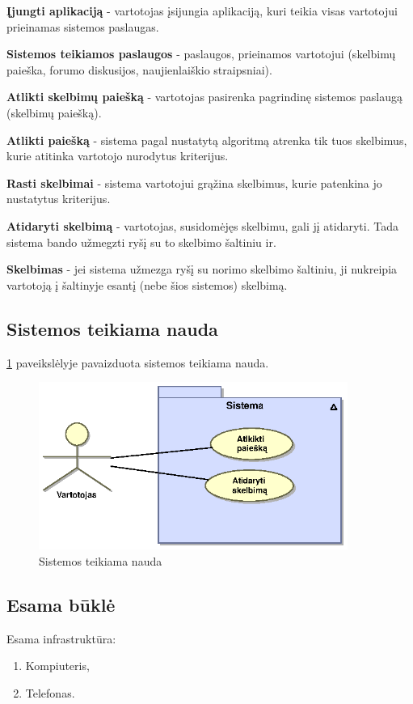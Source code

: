 \documentclass[12pt]{article}
\begin{document}
	\textbf{Įjungti aplikaciją} - vartotojas įsijungia aplikaciją, kuri teikia visas vartotojui prieinamas sistemos paslaugas.
	
	\textbf{Sistemos teikiamos paslaugos} - paslaugos, prieinamos vartotojui (skelbimų paieška, forumo diskusijos, naujienlaiškio straipsniai).
	
	\textbf{Atlikti skelbimų paiešką} - vartotojas pasirenka pagrindinę sistemos paslaugą (skelbimų paiešką).
	
	\textbf{Atlikti paiešką} - sistema pagal nustatytą algoritmą atrenka tik tuos skelbimus, kurie atitinka vartotojo nurodytus kriterijus.
	
	\textbf{Rasti skelbimai} - sistema vartotojui grąžina skelbimus, kurie patenkina jo nustatytus kriterijus.
	
	\textbf{Atidaryti skelbimą} - vartotojas, susidomėjęs skelbimu, gali jį  atidaryti. Tada sistema bando užmegzti ryšį su to skelbimo šaltiniu ir.
	
	\textbf{Skelbimas} - jei sistema užmezga ryšį su norimo skelbimo šaltiniu, ji nukreipia vartotoją į šaltinyje esantį (nebe šios sistemos) skelbimą.
	
	\subsection{Sistemos teikiama nauda}
	\ref{Gain} paveikslėlyje pavaizduota sistemos teikiama nauda.
	
	\begin{figure}[h]
		\begin{center}
			\includegraphics[width=0.9\textwidth]{Nauda.eps}
			\caption{Sistemos teikiama nauda\label{Gain}}
		\end{center}
	\end{figure}
	\pagebreak
	
	\subsection{Esama būklė}
	Esama infrastruktūra:
	\begin{enumerate}
		\item{Kompiuteris,}
		\item{Telefonas.}
	\end{enumerate}
	
\end{document}
